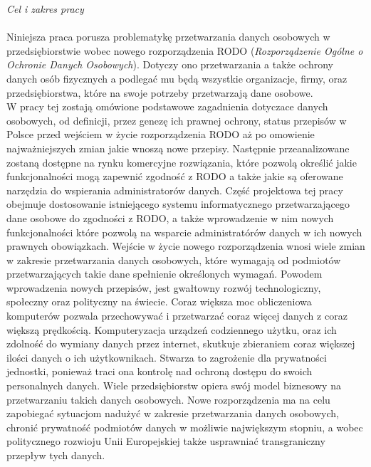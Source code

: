 \documentclass[en, noamssymb]{mgr}
\begin{document}
\textit{Cel i zakres pracy}\\ \\
\indent Niniejsza praca porusza problematykę przetwarzania danych osobowych w przedsiębiorstwie wobec nowego rozporządzenia RODO (\textit{Rozporządzenie Ogólne o Ochronie Danych Osobowych}). Dotyczy ono przetwarzania a także ochrony danych osób fizycznych a podlegać mu będą wszystkie organizacje, firmy, oraz przedsiębiorstwa, które na swoje potrzeby przetwarzają dane osobowe.\\
\indent W pracy tej zostają omówione podstawowe zagadnienia dotyczace danych osobowych, od definicji, przez genezę ich prawnej ochrony, status przepisów w Polsce przed wejściem w życie rozporządzenia RODO aż po omowienie najważniejszych zmian jakie wnoszą nowe przepisy. Następnie przeanalizowane zostaną dostępne na rynku komercyjne rozwiązania, które pozwolą określić jakie funkcjonalności mogą zapewnić zgodność z RODO a także jakie są oferowane narzędzia do wspierania administratorów danych. Część projektowa tej pracy obejmuje dostosowanie istniejącego systemu informatycznego przetwarzającego dane osobowe do zgodności z RODO, a także wprowadzenie w nim nowych funkcjonalności które pozwolą na wsparcie administratórów danych w ich nowych prawnych obowiązkach.
\indent Wejście w życie nowego rozporządzenia wnosi wiele zmian w zakresie przetwarzania danych osobowych, które wymagają od podmiotów przetwarzających takie dane spełnienie określonych wymagań. Powodem wprowadzenia nowych przepisów, jest gwałtowny rozwój technologiczny, społeczny oraz polityczny na świecie. Coraz większa moc obliczeniowa komputerów pozwala przechowywać i przetwarzać coraz więcej danych z coraz większą prędkością. Komputeryzacja urządzeń codziennego użytku, oraz ich zdolność do wymiany danych przez internet, skutkuje zbieraniem coraz większej ilości danych o ich użytkownikach. Stwarza to zagrożenie dla prywatności jednostki, ponieważ traci ona kontrolę nad ochroną dostępu do swoich personalnych danych. Wiele przedsiębiorstw opiera swój model biznesowy na przetwarzaniu takich danych osobowych. Nowe rozporządzenia ma na celu zapobiegać sytuacjom nadużyć w zakresie przetwarzania danych osobowych, chronić prywatność podmiotów danych w możliwie największym stopniu, a wobec politycznego rozwioju Unii Europejskiej także usprawniać transgraniczny przepływ tych danych.\\ \\
\end{document}
